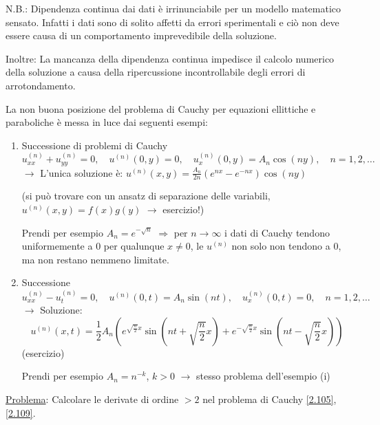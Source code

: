 \documentclass[a4paper,11pt]{report}
\begin{document}
N.B.: Dipendenza continua dai dati \`e irrinunciabile per un modello matematico sensato. Infatti i dati sono di solito affetti da errori sperimentali e ci\`o non deve essere causa di un comportamento imprevedibile della soluzione.

\smallskip

Inoltre: La mancanza della dipendenza continua impedisce il calcolo numerico della soluzione a causa della ripercussione incontrollabile degli errori di arrotondamento.

\smallskip

La non buona posizione del problema di Cauchy per equazioni ellittiche e paraboliche \`e messa in luce dai seguenti esempi:
\begin{enumerate}[label=(\roman*)]
\item Successione di problemi di Cauchy
\[
u_{xx}^{(n)} + u_{yy}^{(n)}=0, \quad u^{(n)}(0,y)=0, \quad u_x^{(n)}(0,y)=A_n\cos(ny), \quad n=1,2,\dots
\]
$\rightarrow$ L'unica soluzione \`e: $u^{(n)}(x,y)=\frac{A_n}{2n}(e^{nx}-e^{-nx})\cos(ny) $

(si pu\`o trovare con un ansatz di separazione delle variabili, $u^{(n)}(x,y)=f(x)g(y)$ $\rightarrow$ esercizio!)

Prendi per esempio $A_n=e^{-\sqrt{n}}$ $\Rightarrow$ per $n\to \infty$ i dati di Cauchy tendono uniformemente a 0 per qualunque $x\neq 0$, le $u^{(n)}$ non solo non tendono a 0, ma non restano nemmeno limitate.
\item Successione 
\[
u_{xx}^{(n)} - u_t^{(n)}=0, \quad u^{(n)}(0,t)=A_n\sin(nt), \quad u_x^{(n)}(0,t)=0, \quad n=1,2,\dots
\]
$\rightarrow$ Soluzione: 
\[
u^{(n)}(x,t) =\frac{1}{2}A_n\left(e^{\sqrt{\frac{n}{2}}x}\sin\left(nt+\sqrt{\frac{n}{2}}x\right) + e^{-\sqrt{\frac{n}{2}}x}\sin\left(nt-\sqrt{\frac{n}{2}}x\right)\right) 
\]
(esercizio)

Prendi per esempio $A_n=n^{-k}$, $k>0$ $\rightarrow$ stesso problema dell'esempio (i)
\end{enumerate}

\underline{Problema}: Calcolare le derivate di ordine $>2$ nel problema di Cauchy \eqref{2.105}, \eqref{2.109}.
\end{document}
